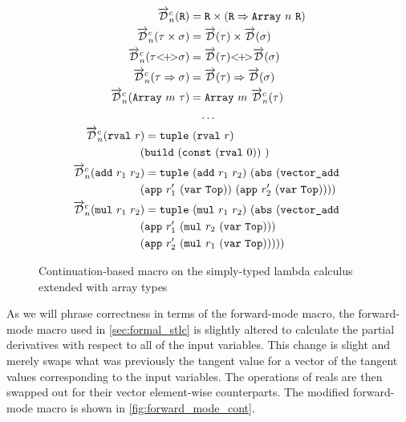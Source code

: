   \begin{figure}
    \centering
    \begin{gather*}
      \begin{aligned}
        \overrightarrow{\mathcal{D}}^c_n(\texttt{R}) &= \texttt{R} \times (\texttt{R} \Rightarrow \texttt{Array}\ n\ \texttt{R}) \\
        \overrightarrow{\mathcal{D}}^c_n(\tau \times \sigma) &= \overrightarrow{\mathcal{D}}(\tau) \times \overrightarrow{\mathcal{D}}(\sigma) \\
        \overrightarrow{\mathcal{D}}^c_n(\tau {<}\!{+}\!{>} \sigma) &= \overrightarrow{\mathcal{D}}(\tau) {<}\!{+}\!{>} \overrightarrow{\mathcal{D}}(\sigma) \\
        \overrightarrow{\mathcal{D}}^c_n(\tau \Rightarrow \sigma) &= \overrightarrow{\mathcal{D}}(\tau) \Rightarrow \overrightarrow{\mathcal{D}}(\sigma) \\
        \overrightarrow{\mathcal{D}}^c_n(\texttt{Array}\ m\ \tau) &= \texttt{Array}\ m\ \overrightarrow{\mathcal{D}}^c_n(\tau) \\
      \end{aligned}
      \\
      \begin{gathered}
        \dots \\
        \begin{aligned}
        \overrightarrow{\mathcal{D}}^c_n(\texttt{rval}\ r&) = \texttt{tuple}\ (\texttt{rval}\ r)\ \\
          &{(\texttt{build}\ (\texttt{const}\ (\texttt{rval}\ 0))\ )} \\
        \overrightarrow{\mathcal{D}}^c_n(\texttt{add}\ r_1\ r_2&) = \texttt{tuple}\ (\texttt{add}\ r_1\ r_2)\ (\texttt{abs}\ (\texttt{vector\_add}\  \\
          &(\texttt{app}\ r_1'\ (\texttt{var}\ \texttt{Top}))\ (\texttt{app}\ r_2'\ (\texttt{var}\ \texttt{Top})))) \\
        \overrightarrow{\mathcal{D}}^c_n(\texttt{mul}\ r_1\ r_2&) = \texttt{tuple}\ (\texttt{mul}\ r_1\ r_2)\ (\texttt{abs}\ (\texttt{vector\_add}\  \\
          &(\texttt{app}\ r_1'\ (\texttt{mul}\ r_2\ (\texttt{var}\ \texttt{Top})))\  \\
          &(\texttt{app}\ r_2'\ (\texttt{mul}\ r_1\ (\texttt{var}\ \texttt{Top}))))) \\
        \end{aligned}
      \end{gathered}
    \end{gather*}
    \caption{Continuation-based macro on the simply-typed lambda calculus extended with array types}
    \label{fig:continuation_macro}
  \end{figure}

  As we will phrase correctness in terms of the forward-mode macro, the forward-mode macro used in \cref{sec:formal_stlc} is slightly altered to calculate the partial derivatives with respect to all of the input variables.
  This change is slight and merely swaps what was previously the tangent value for a vector of the tangent values corresponding to the input variables.
  The operations of reals are then swapped out for their vector element-wise counterparts.
  The modified forward-mode macro is shown in \cref{fig:forward_mode_cont}.

